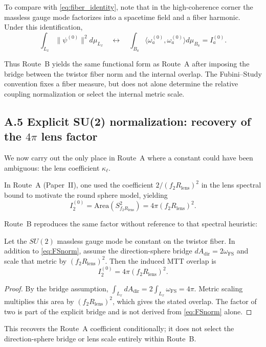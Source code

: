 \documentclass[11pt]{article}
\begin{document}
To compare with \eqref{eq:fiber_identity}, note that in the high-coherence corner the
massless gauge mode factorizes into a spacetime field and a fiber harmonic. Under this
identification,
\[
\int_{L_x}\|\psi^{(0)}\|^2 d\mu_{L_x}
\quad \leftrightarrow \quad
\int_{B_a}\langle\omega_a^{(0)},\omega_a^{(0)}\rangle d\mu_{B_a}
= I_a^{(0)}.
\]

Thus Route~B yields the same functional form as Route~A after imposing the
bridge between the twistor fiber norm and the internal overlap. The
Fubini--Study convention fixes a fiber measure, but does not alone determine
the relative coupling normalization or select the internal metric scale.

\subsection{A.5 Explicit SU(2) normalization: recovery of the $4\pi$ lens factor}

We now carry out the only place in Route~A where a constant could have been ambiguous:
the lens coefficient $\kappa_\ell$.

In Route~A (Paper~II), one used the coefficient $2/(f_2R_{\mathrm{lens}})^2$ in the lens
spectral bound to motivate the round sphere model, yielding
\[
I_2^{(0)} = \mathrm{Area}(S^2_{f_2R_{\mathrm{lens}}}) = 4\pi (f_2R_{\mathrm{lens}})^2.
\]

Route~B reproduces the same factor without reference to that spectral heuristic:

\begin{proposition}[Conditional recovery of $\kappa_\ell=4\pi$]
Let the $SU(2)$ massless gauge mode be constant on the twistor fiber. In
addition to \eqref{eq:FSnorm}, assume the direction-sphere bridge
$dA_{\mathrm{dir}}=2\omega_{\mathrm{FS}}$ and scale that metric by
$(f_2R_{\mathrm{lens}})^2$. Then the induced MTT overlap is
\[
I_2^{(0)} = 4\pi(f_2R_{\mathrm{lens}})^2.
\]
\end{proposition}

\begin{proof}
By the bridge assumption,
$\int_{L_x}dA_{\mathrm{dir}}=2\int_{L_x}\omega_{\mathrm{FS}}=4\pi$.
Metric scaling multiplies this area by $(f_2R_{\mathrm{lens}})^2$,
which gives the stated overlap. The factor of two is part of the explicit
bridge and is not derived from \eqref{eq:FSnorm} alone.
\end{proof}

This recovers the Route~A coefficient conditionally; it does not select the
direction-sphere bridge or lens scale entirely within Route~B.
\end{document}
